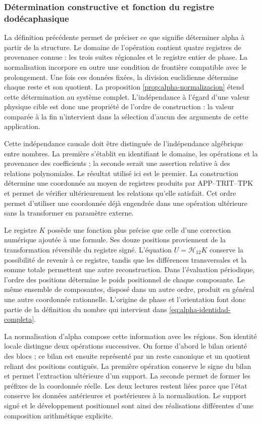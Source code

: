 \subsubsection{Détermination constructive et fonction du registre dodécaphasique}
\label{alpha-ampl-dependencias}

La définition précédente permet de préciser ce que signifie déterminer alpha à partir
de la structure. Le domaine de l'opération contient quatre registres de
provenance connue : les trois suites régionales et le registre entier
de phase. La normalisation incorpore en outre une condition de frontière
compatible avec le prolongement. Une fois ces données fixées, la division
euclidienne détermine chaque reste et son quotient. La proposition
\ref{prop:alpha-normalizacion} étend cette détermination au système
complet. L'indépendance à l'égard d'une valeur physique cible est donc
une propriété de l'ordre de construction : la valeur comparée à la
fin n'intervient dans la sélection d'aucun des arguments de cette
application.

Cette indépendance causale doit être distinguée de l'indépendance algébrique
entre nombres. La première s'établit en identifiant le domaine, les
opérations et la provenance des coefficients ; la seconde serait une
assertion relative à des relations polynomiales. Le résultat utilisé ici est le
premier. La construction détermine une coordonnée au moyen de registres
produits par APP--TRIT--TPK et permet de vérifier ultérieurement les
relations qu'elle satisfait. Cet ordre permet d'utiliser une coordonnée déjà
engendrée dans une opération ultérieure sans la transformer en paramètre externe.

Le registre $K$ possède une fonction plus précise que celle d'une correction
numérique ajoutée à une formule. Ses douze positions proviennent de la
transformation réversible du registre signé. L'équation
$U=\mathcal H_{12}K$ conserve la possibilité de revenir à ce registre,
tandis que les différences transversales et la somme totale permettent une autre
reconstruction. Dans l'évaluation périodique, l'ordre des positions
détermine le poids positionnel de chaque composante. Le même ensemble de
composantes, disposé dans un autre ordre, produit en général une autre coordonnée
rationnelle. L'origine de phase et l'orientation font donc partie de la
définition du nombre qui intervient dans \eqref{eq:alpha-identidad-completa}.

La normalisation d'alpha compose cette information avec les régions. Son
identité locale distingue deux opérations successives. On forme d'abord le
bilan orienté des blocs ; ce bilan est ensuite représenté par
un reste canonique et un quotient reliant des positions contiguës. La première
opération conserve le signe du bilan et permet l'extraction ultérieure
d'un support. La seconde permet de former les préfixes de la coordonnée
réelle. Les deux lectures restent liées parce que l'état conserve les
données antérieures et postérieures à la normalisation. Le support signé et le
développement positionnel sont ainsi des réalisations différentes d'une composition
arithmétique explicite.

